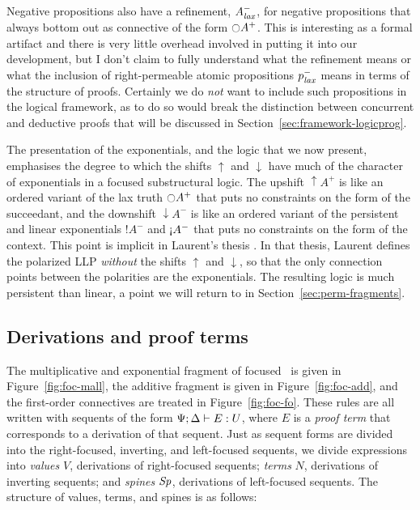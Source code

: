 Negative propositions also have a refinement, $A^-_{\it lax}$, for
negative propositions that always bottom out as connective 
of the form
${\ocircle}A^+$.  This is interesting as a formal artifact and there
is very little overhead involved in putting it into our development,
but I don't claim to fully understand what the refinement means or
what the inclusion of right-permeable atomic propositions $p^-_{\it lax}$
means in terms of the structure of proofs. Certainly we do {\it not}
want to include such propositions in the logical framework, as to do
so would break the distinction between concurrent and deductive proofs
that will be discussed in Section~\ref{sec:framework-logicprog}.

The presentation of the exponentials, and the logic that we now
present, emphasises the degree to which the shifts ${\uparrow}$ and
${\downarrow}$ have much of the character of exponentials in a focused
substructural logic. The upshift ${\uparrow}A^+$ is like an ordered
variant of the lax truth ${\ocircle}A^+$ that puts no constraints on
the form of the succeedant, and the downshift ${\downarrow}A^-$ is
like an ordered variant of the persistent and linear exponentials
${!}A^-$ and ${\gnab}A^-$ that puts no constraints on the form of the
context. This point is implicit in Laurent's thesis
\cite{laurent02etude}. In that thesis, Laurent defines the polarized
LLP {\it without} the shifts ${\uparrow}$ and ${\downarrow}$, so that
the only connection points between the polarities are the
exponentials. The resulting logic is much persistent than linear,
a point we will return to in Section~\ref{sec:perm-fragments}.

\subsection{Derivations and proof terms}
\label{sec:ord-proof-terms}





The multiplicative and exponential fragment of focused \ollll~is given
in Figure~\ref{fig:foc-mall}, the additive fragment is given in
Figure~\ref{fig:foc-add}, and the first-order connectives are treated
in Figure~\ref{fig:foc-fo}. These rules are all written with sequents
of the form ${\Psi}; {\Delta} \vdash {E} : {U}$, where $E$ is a {\it proof
  term} that corresponds to a derivation of that sequent. Just
as sequent forms are divided into the right-focused, inverting, and
left-focused sequents, we divide expressions into {\it values} $V$,
derivations of right-focused sequents; {\it terms} $N$,
derivations of inverting sequents; and {\it spines} ${\it Sp}$,
derivations of left-focused sequents. The structure of
values, terms, and spines is as follows:


